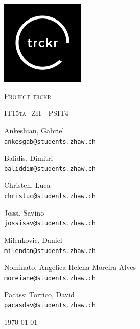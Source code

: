 \documentclass[bibliography=totoc, listof=totocnumbered]{scrartcl}
\begin{document}
\begin{titlepage}
\thispagestyle{firstpage}
\centering
\includegraphics[width=0.3\textwidth]{logo}\par
\vspace{1cm}

{\scshape\LARGE Project trckr \par}
\vspace{0.3cm}

{\scshape IT15ta\_ZH - PSIT4\par}
\vspace{0.5cm}
Ankeshian, Gabriel\\
\texttt{ankesgab@students.zhaw.ch}

\vspace{0.2cm}
Balidis, Dimitri\\
\texttt{baliddim@students.zhaw.ch}

\vspace{0.2cm}
Christen, Luca\\
\texttt{chrisluc@students.zhaw.ch}

\vspace{0.2cm}
Jossi, Savino\\
\texttt{jossisav@students.zhaw.ch}

\vspace{0.2cm}
Milenkovic, Daniel\\
\texttt{milendan@students.zhaw.ch}

\vspace{0.2cm}
Nominato, Angelica Helena Moreira Alves\\
\texttt{moreiane@students.zhaw.ch}

\vspace{0.2cm}
Pacassi Torrico, David\\
\texttt{pacasdav@students.zhaw.ch}

\vfill

	{\large \today\par}
\end{titlepage}

\end{document}
